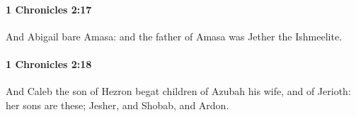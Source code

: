 		\paragraph{1 Chronicles 2:17} %
			\label{1CHRONICLES-2-17}

			And Abigail bare Amasa: and the father of Amasa was Jether the Ishmeelite.


		\paragraph{1 Chronicles 2:18} %
			\label{1CHRONICLES-2-18}

			And Caleb the son of Hezron begat children of Azubah his wife, and of Jerioth: her sons are these; Jesher, and Shobab, and Ardon.


